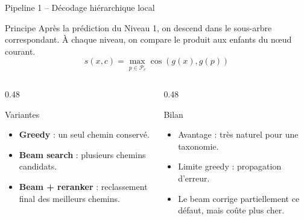 \documentclass[11pt,aspectratio=169]{beamer}
\begin{document}
\begin{frame}{Pipeline 1 -- Décodage hiérarchique local}
\small
\begin{block}{Principe}
Après la prédiction du Niveau 1, on descend dans le sous-arbre correspondant. À chaque niveau, on compare le produit aux enfants du nœud courant.
\[
s(x,c)=\max_{p\in \mathcal{P}_c}\cos(g(x),g(p))
\]
\end{block}

\begin{columns}
\begin{column}{0.48\textwidth}
\begin{block}{Variantes}
\begin{itemize}
    \item \textbf{Greedy} : un seul chemin conservé.
    \item \textbf{Beam search} : plusieurs chemins candidats.
    \item \textbf{Beam + reranker} : reclassement final des meilleurs chemins.
\end{itemize}
\end{block}
\end{column}

\begin{column}{0.48\textwidth}
\begin{block}{Bilan}
\begin{itemize}
    \item Avantage : très naturel pour une taxonomie.
    \item Limite greedy : propagation d'erreur.
    \item Le beam corrige partiellement ce défaut, mais coûte plus cher.
\end{itemize}
\end{block}
\end{column}
\end{columns}
\end{frame}
\end{document}
